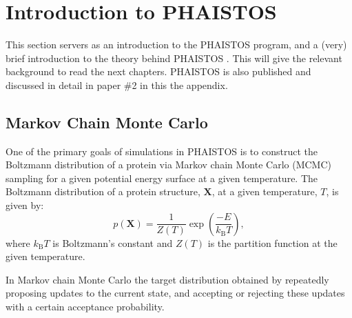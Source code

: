 \chapter{Introduction to PHAISTOS}

This section servers as an introduction to the PHAISTOS program, and a (very) brief introduction to the theory behind PHAISTOS \cite{Phaistos}. 
This will give the relevant background to read the next chapters.
PHAISTOS is also published and discussed in detail in paper \#2 in this the appendix.

\section{Markov Chain Monte Carlo}

One of the primary goals of simulations in PHAISTOS is to construct the Boltzmann distribution of a protein via Markov chain Monte Carlo (MCMC) sampling for a given potential energy surface at a given temperature.
The Boltzmann distribution of a protein structure, $\mathbf X$, at a given temperature, $T$, is given by:
\begin{equation}
    \label{eq:boltzmann}
    p(\mathbf X) = \frac{1}{Z(T)} \exp{\left( \frac{-E}{k_\mathrm{B}T}\right)},
\end{equation}
where $k_\mathrm{B}T$ is Boltzmann's constant and $Z(T)$ is the partition function at the given temperature.

In Markov chain Monte Carlo the target distribution obtained by repeatedly proposing updates to the current state, and accepting or rejecting these updates with a certain acceptance probability.

